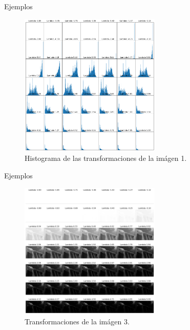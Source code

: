 \documentclass{beamer}
\begin{document}
\begin{frame}{Ejemplos}
    \begin{figure}
        \centering
        \includegraphics[width=0.6\textwidth]{all_lambda_hist_1.png}
        \caption{Histograma de las transformaciones de la im\'agen 1.}
        \label{fig:img_bci_hist_1}
    \end{figure}
\end{frame}



\begin{frame}{Ejemplos}
    \begin{figure}
        \centering
        \includegraphics[width=0.6\textwidth]{all_lambda_3.png}
        \caption{Transformaciones de la im\'agen 3.}
        \label{fig:all_lambda_2}
    \end{figure}
\end{frame}
\end{document}
